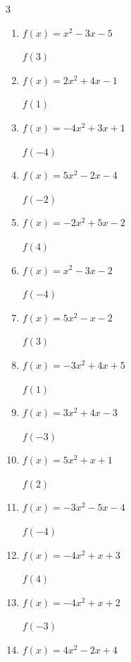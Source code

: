 \begin{multicols}{3}
\begin{enumerate}
$f(-3)$
        \phantom{$= -38$}

  \item $f(x)=x^{2}-3x-5$

$f(3)$
        \phantom{$= -5$}

  \item $f(x)=2x^{2}+4x-1$

$f(1)$
        \phantom{$= 5$}

  \item $f(x)=-4x^{2}+3x+1$

$f(-4)$
        \phantom{$= -75$}

  \item $f(x)=5x^{2}-2x-4$

$f(-2)$
        \phantom{$= 20$}

  \item $f(x)=-2x^{2}+5x-2$

$f(4)$
        \phantom{$= -14$}

  \item $f(x)=x^{2}-3x-2$

$f(-4)$
        \phantom{$= 26$}

  \item $f(x)=5x^{2}-x-2$

$f(3)$
        \phantom{$= 40$}

  \item $f(x)=-3x^{2}+4x+5$

$f(1)$
        \phantom{$= 6$}

  \item $f(x)=3x^{2}+4x-3$

$f(-3)$
        \phantom{$= 12$}

  \item $f(x)=5x^{2}+x+1$

$f(2)$
        \phantom{$= 23$}

  \item $f(x)=-3x^{2}-5x-4$

$f(-4)$
        \phantom{$= -32$}

  \item $f(x)=-4x^{2}+x+3$

$f(4)$
        \phantom{$= -57$}

  \item $f(x)=-4x^{2}+x+2$

$f(-3)$
        \phantom{$= -37$}

\columnbreak %

\resetques

  \item $f(x)=4x^{2}-2x+4$


\end{enumerate}
\end{multicols}
